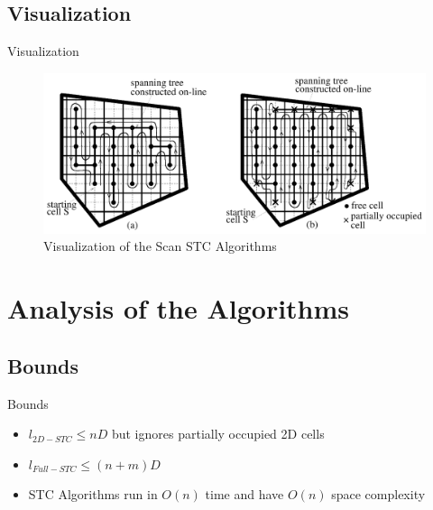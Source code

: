 \documentclass{beamer}
\begin{document}
\subsection{Visualization}
\begin{frame}{Visualization}
    \begin{figure}
        \includegraphics[width=\linewidth]{Images/inv_fig7.png}
        \caption{Visualization of the Scan STC Algorithms}
    \end{figure}
\end{frame}

\section{Analysis of the Algorithms}
\subsection{Bounds}
\begin{frame}{Bounds}
    \begin{itemize}
        \item $l_{2D-STC} \leq nD$ but ignores partially occupied 2D cells
        \item $l_{Full-STC} \leq (n + m)D$
        \item STC Algorithms run in $O(n)$ time and have $O(n)$ space complexity
    \end{itemize}
\end{frame}
\end{document}
